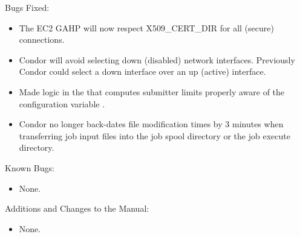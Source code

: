 \noindent Bugs Fixed:

\begin{itemize}

\item The EC2 GAHP will now respect X509\_CERT\_DIR for all (secure) connections.

\item Condor will avoid selecting down (disabled) network interfaces.  Previously Condor could select a down interface over an up (active) interface.

\item Made logic in the  that computes submitter limits 
properly aware of the configuration variable
.


\item Condor no longer back-dates file modification times by 3 minutes
when transferring job input files into the job spool directory or the job
execute directory.

\end{itemize}

\noindent Known Bugs:

\begin{itemize}

\item None.

\end{itemize}

\noindent Additions and Changes to the Manual:

\begin{itemize}

\item None.

\end{itemize}


